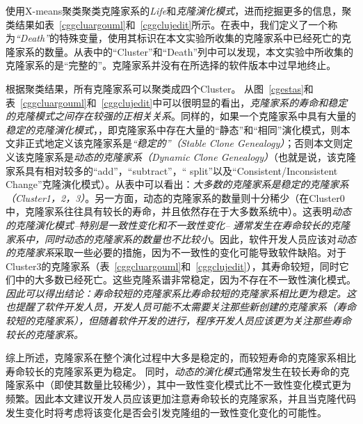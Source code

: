 {使用X-means聚类聚类克隆家系的{\em Life}和{\em 克隆演化模式}，进而挖掘更多的信息，聚类结果如表~\ref{cggcluargouml}和~\ref{cggclujedit}所示。在表中，我们定义了一个称为{\em “Death”}的特殊变量，使用其标识在本文实验所收集的克隆家系中已经死亡的克隆家系的数量。从表中的“Cluster”和“Death”列中可以发现，本文实验中所收集的克隆家系的是“完整的”。克隆家系并没有在所选择的软件版本中过早地终止。%

根据聚类结果，所有克隆家系可以聚类成四个Cluster。%
从图~\ref{cgestas}和表~\ref{cggcluargouml}和~\ref{cggclujedit}中可以很明显的看出，{\em  克隆家系的寿命和稳定的克隆模式之间存在较强的正相关关系}。同样的，如果一个克隆家系中具有大量的{\em 稳定的克隆演化模式}，，即克隆家系中存在大量的“静态”和“相同”演化模式，则本文非正式地定义该克隆家系是{\em “稳定的”（Stable Clone Genealogy）}；否则本文则定义该克隆家系是{\em 动态的克隆家系（Dynamic Clone Genealogy）}（也就是说，该克隆家系具有相对较多的“add”，“subtract”，“ split”以及“Consistent/Inconsistent Change”克隆演化模式）。从表中可以看出：{\em 大多数的克隆家系是稳定的克隆家系（Cluster1，2，3）}。另一方面，动态的克隆家系的数量则十分稀少（在Cluster0中，克隆家系往往具有较长的寿命，并且依然存在于大多数系统中）。这表明{\em 动态的克隆演化模式--特别是一致性变化和不一致性变化-- 通常发生在寿命较长的克隆家系中，同时动态的克隆家系的数量也不比较小}。因此，软件开发人员应该对{\em  动态的克隆家系}采取一些必要的措施，因为不一致性的变化可能导致软件缺陷。对于Cluster3的克隆家系（表~\ref{cggcluargouml}和~\ref{cggclujedit}），其寿命较短，同时它们中的大多数已经死亡。这些克隆系谱非常稳定，因为不存在不一致性演化模式。 {\em 因此可以得出结论：寿命较短的克隆家系比寿命较短的克隆家系相比更为稳定。这也提醒了软件开发人员，开发人员可能不太需要关注那些新创建的克隆家系（寿命较短的克隆家系），但随着软件开发的进行，程序开发人员应该更为关注那些寿命较长的克隆家系。}

综上所述，克隆家系在整个演化过程中大多是稳定的，而较短寿命的克隆家系相比寿命较长的克隆家系更为稳定。 同时，{\em 动态的演化模式}通常发生在较长寿命的克隆家系中（即使其数量比较稀少），其中一致性变化模式比不一致性变化模式更为频繁。因此本文建议开发人员应该更加注意寿命较长的克隆家系，并且当克隆代码发生变化时将考虑将该变化是否会引发克隆组的一致性变化变化的可能性。
 
 

}
